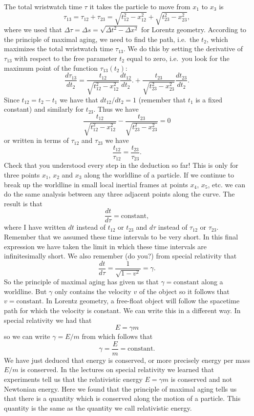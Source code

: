 {\begin{multicols}{2}
The total wristwatch time $\tau$ it takes the particle to move from $x_1$ to $x_3$ is
\begin{equation}
\label{eq:maxag}
\tau_{13}=\tau_{12}+\tau_{23}=\sqrt{t_{12}^2-x_{12}^2}+\sqrt{t_{23}^2-x_{23}^2},
\end{equation}
where we used that $\Delta\tau=\Delta s=\sqrt{\Delta t^2-\Delta x^2}$ for Lorentz geometry. According to the principle of maximal aging, we need to find the path, i.e.\ the $t_{2}$, which maximizes the total wristwatch time $\tau_{13}$. We do this by setting the derivative of $\tau_{13}$ with respect to the free parameter $t_{2}$ equal to zero, i.e.\ you look for the maximum point of the function $\tau_{13}(t_{2})$:
\[
\frac{d\tau_{13}}{dt_{2}}=\frac{t_{12}}{\sqrt{t_{12}^2-x_{12}^2}}\frac{dt_{12}}{dt_{2}}.+\frac{t_{23}}{\sqrt{t_{23}^2-x_{23}^2}}\frac{dt_{23}}{dt_{2}}.
\]
Since $t_{12}=t_{2}-t_{1}$ we have that $dt_{12}/dt_{2}=1$ (remember that $t_{1}$ is a fixed constant) and similarly for $t_{23}$. Thus we have
\[
\frac{t_{12}}{\sqrt{t_{12}^2-x_{12}^2}}-\frac{t_{23}}{\sqrt{t_{23}^2-x_{23}^2}}=0
\]
or written in terms of $\tau_{12}$ and $\tau_{23}$ we have
\[
\frac{t_{12}}{\tau_{12}}=\frac{t_{23}}{\tau_{23}}.
\]
Check that you understood every step in the deduction so far! This is only for three points $x_1$, $x_2$ and $x_3$ along the worldline of a particle. If we continue to break up the worldline in small local inertial frames at points $x_4$, $x_5$, etc. we can do the same analysis between any three adjacent points along the curve. The result is that
\[
\frac{dt}{d\tau}=\mathrm{constant},
\]
where I have written $dt$ instead of $t_{12}$ or $t_{23}$ and $d\tau$ instead of $\tau_{12}$ or $\tau_{23}$. Remember that we assumed these time intervals to be very short. In this final expression we have taken the limit in which these time intervals are infinitesimally short. We also remember (do you?) from special relativity that
\[
\frac{dt}{d\tau}=\frac{1}{\sqrt{1-v^2}}=\gamma.
\]
So the principle of maximal aging has given us that $\gamma=\mathrm{constant}$ along a worldline. But $\gamma$ only contains the velocity $v$ of the object so it follows that $v=\mathrm{constant}$. In Lorentz geometry, a free-float object will follow the spacetime path for which the velocity is constant. We can write this in a different way. In special relativity we had that
\[
E=\gamma m
\]
so we can write $\gamma=E/m$ from which follows that
\[
\gamma=\frac{E}{m}=\mathrm{constant}.
\]
We have just deduced that energy is conserved, or more precisely energy per mass $E/m$ is conserved. In the lectures on special relativity we learned that experiments tell us that the relativistic energy $E=\gamma m$ is conserved and not Newtonian energy. Here we found that the principle of maximal aging tells us that there is a quantity which is conserved along the motion of a particle. This quantity is the same as the quantity we call relativistic energy. 


\end{multicols}}
